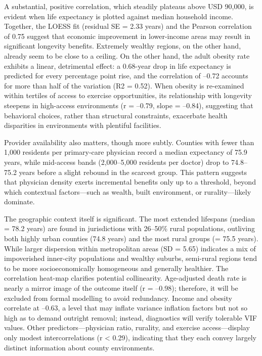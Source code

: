 \documentclass[
  12pt,
]{article}
\begin{document}
A substantial, positive correlation, which steadily plateaus above USD
90,000, is evident when life expectancy is plotted against median
household income. Together, the LOESS fit (residual SE = 2.33 years) and
the Pearson correlation of 0.75 suggest that economic improvement in
lower-income areas may result in significant longevity benefits.
Extremely wealthy regions, on the other hand, already seem to be close
to a ceiling. On the other hand, the adult obesity rate exhibits a
linear, detrimental effect: a 0.68-year drop in life expectancy is
predicted for every percentage point rise, and the correlation of --0.72
accounts for more than half of the variation (R2 = 0.52). When obesity
is re-examined within tertiles of access to exercise opportunities, its
relationship with longevity steepens in high-access environments (r =
--0.79, slope = --0.84), suggesting that behavioral choices, rather than
structural constraints, exacerbate health disparities in environments
with plentiful facilities.

Provider availability also matters, though more subtly. Counties with
fewer than 1,000 residents per primary-care physician record a median
expectancy of 75.9 years, while mid-access bands (2,000--5,000 residents
per doctor) drop to 74.8--75.2 years before a slight rebound in the
scarcest group. This pattern suggests that physician density exerts
incremental benefits only up to a threshold, beyond which contextual
factors---such as wealth, built environment, or rurality---likely
dominate.

The geographic context itself is significant. The most extended
lifespans (median = 78.2 years) are found in jurisdictions with 26--50\%
rural populations, outliving both highly urban counties (74.8 years) and
the most rural groups (= 75.5 years). While larger dispersion within
metropolitan areas (SD = 5.65) indicates a mix of impoverished
inner-city populations and wealthy suburbs, semi-rural regions tend to
be more socioeconomically homogeneous and generally healthier. The
correlation heat-map clarifies potential collinearity. Age-adjusted
death rate is nearly a mirror image of the outcome itself (r = --0.98);
therefore, it will be excluded from formal modelling to avoid
redundancy. Income and obesity correlate at --0.63, a level that may
inflate variance inflation factors but not so high as to demand outright
removal; instead, diagnostics will verify tolerable VIF values. Other
predictors---physician ratio, rurality, and exercise access---display
only modest intercorrelations (\textbar r\textbar{} \textless{} 0.29),
indicating that they each convey largely distinct information about
county environments.
\end{document}
